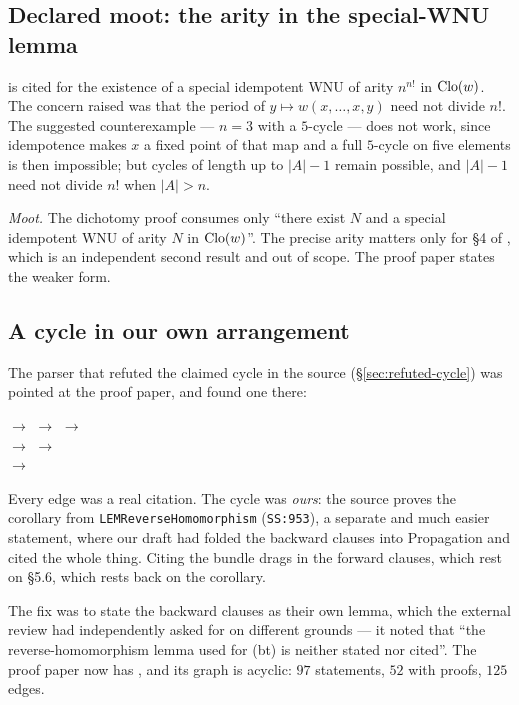 \subsection{Declared moot: the arity in the special-WNU lemma}\label{sec:moot}

\cite[Lem.~4.7]{MarotiMcKenzie} is cited for the existence of a special
idempotent WNU of arity $n^{n!}$ in $\operatorname{Clo}(w)$. The concern raised was that the
period of $y\mapsto w(x,\dots,x,y)$ need not divide $n!$. The suggested
counterexample --- $n=3$ with a $5$-cycle --- does not work, since idempotence
makes $x$ a fixed point of that map and a full $5$-cycle on five elements is
then impossible; but cycles of length up to $|A|-1$ remain possible, and
$|A|-1$ need not divide $n!$ when $|A|>n$.

\emph{Moot.} The dichotomy proof consumes only ``there exist $N$ and a special
idempotent WNU of arity $N$ in $\operatorname{Clo}(w)$''. The precise arity matters only for
\S4 of \cite{ZhukSimplified}, which is an independent second result and out of
scope. The proof paper states the weaker form.

\subsection{A cycle in our own arrangement}\label{sec:our-cycle}

The parser that refuted the claimed cycle in the source
(\S\ref{sec:refuted-cycle}) was pointed at the proof paper, and found one
there:
\begin{center}\footnotesize
{} $\to$  $\to$
 $\to$\\[2pt]
 $\to$  $\to$\\[2pt]
 $\to$ 
\end{center}
Every edge was a real citation. The cycle was \emph{ours}: the source proves
the corollary from \texttt{LEMReverseHomomorphism} (\texttt{SS:953}), a
separate and much easier statement, where our draft had folded the backward
clauses into Propagation and cited the whole thing. Citing the bundle drags in
the forward clauses, which rest on \S5.6, which rests back on the corollary.

The fix was to state the backward clauses as their own lemma, which the
external review had independently asked for on different grounds --- it noted
that ``the reverse-homomorphism lemma used for (bt) is neither stated nor
cited''. The proof paper now has , and its graph is
acyclic: $97$ statements, $52$ with proofs, $125$ edges.

